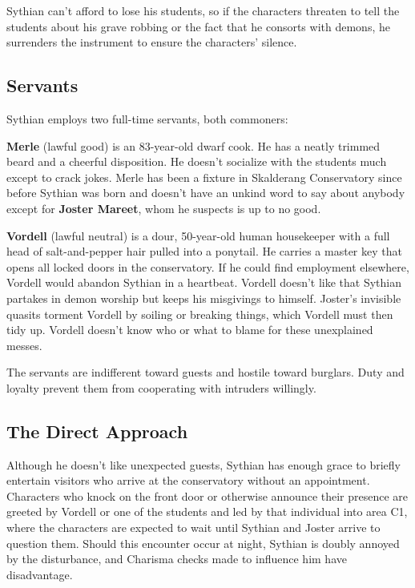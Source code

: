 \documentclass[10pt,a4paper,twoside,bg=print,twocolumn,openany,nodeprecatedcode]{dndbook}
\begin{document}
Sythian can't afford to lose his students, so if the characters threaten to tell the students about his grave robbing or the fact that he consorts with demons, he surrenders the instrument to ensure the characters' silence.

\subsection{Servants}
Sythian employs two full-time servants, both commoners:

\textbf{Merle} (lawful good) is an 83-year-old dwarf cook. He has a neatly trimmed beard and a cheerful disposition. He doesn't socialize with the students much except to crack jokes. Merle has been a fixture in Skalderang Conservatory since before Sythian was born and doesn't have an unkind word to say about anybody except for \textbf{Joster Mareet}, whom he suspects is up to no good.

\textbf{Vordell} (lawful neutral) is a dour, 50-year-old human housekeeper with a full head of salt-and-pepper hair pulled into a ponytail. He carries a master key that opens all locked doors in the conservatory. If he could find employment elsewhere, Vordell would abandon Sythian in a heartbeat. Vordell doesn't like that Sythian partakes in demon worship but keeps his misgivings to himself. Joster's invisible quasits torment Vordell by soiling or breaking things, which Vordell must then tidy up. Vordell doesn't know who or what to blame for these unexplained messes.

The servants are indifferent toward guests and hostile toward burglars. Duty and loyalty prevent them from cooperating with intruders willingly.

\subsection{The Direct Approach}
Although he doesn't like unexpected guests, Sythian has enough grace to briefly entertain visitors who arrive at the conservatory without an appointment. Characters who knock on the front door or otherwise announce their presence are greeted by Vordell or one of the students and led by that individual into area C1, where the characters are expected to wait until Sythian and Joster arrive to question them. Should this encounter occur at night, Sythian is doubly annoyed by the disturbance, and Charisma checks made to influence him have disadvantage.
\end{document}
